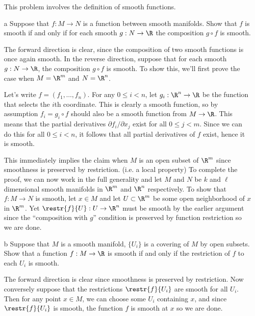 \documentclass[11pt,letterpaper]{article}
\begin{document}
\begin{solution}
    This problem involves the definition of smooth functions.
    \begin{partproblem}{a}
        Suppose that $f : M \to N$ is a function between smooth manifolds. Show that $f$ is smooth if and only if for each smooth $g: N \to \R$ the composition $g\circ f$ is smooth.
    \end{partproblem}

    \begin{solution}
        \quad The forward direction is clear, since the composition of two smooth functions is once again smooth. In the reverse direction, suppose that for each smooth $g : N \to \R$, the composition $g\circ f$ is smooth. To show this, we'll first prove the case when $M=\R^m$ and $N=\R^n$. 

        \quad Let's write $f=(f_1,\ldots,f_n)$. For any $0\leq i < n$, let $g_i : \R^n \to \R$ be the function that selects the $i$th coordinate. This is clearly a smooth function, so by assumption $f_i = g_i\circ f$ should also be a smooth function from $M\to \R$. This means that the partial derivatives $\partial f_i / \partial x_j$ exist for all $0\leq j < m$. Since we can do this for all $0\leq i < n$, it follows that all partial derivatives of $f$ exist, hence it is smooth.
        
        \quad This immediately implies the claim when $M$ is an open subset of $\R^m$ since smoothness is preserved by restriction. (i.e. a local property) To complete the proof, we can now work in the full generality and let $M$ and $N$ be $k$ and $\ell$ dimensional smooth manifolds in $\R^m$ and $\R^n$ respectively. To show that $f : M \to N$ is smooth, let $x\in M$ and let $U\subset \R^m$ be some open neighborhood of $x$ in $\R^m$. Yet $\restr{f}{U} : U \to \R^n$ must be smooth by the earlier argument since the ``composition with $g$'' condition is preserved by function restriction so we are done.
    \end{solution}

    \begin{partproblem}{b}
        Suppose that $M$ is a smooth manifold, $\{U_i\}$ is a covering of $M$ by open subsets. Show that a function $f : M \to \R$ is smooth if and only if the restriction of $f$ to each $U_i$ is smooth.
    \end{partproblem}

    \begin{solution}
        \quad The forward direction is clear since smoothness is preserved by restriction. Now conversely suppose that the restrictions $\restr{f}{U_i}$ are smooth for all $U_i$. Then for any point $x\in M$, we can choose some $U_i$ containing $x$, and since $\restr{f}{U_i}$ is smooth, the function $f$ is smooth at $x$ so we are done.
    \end{solution}


\end{solution}
\end{document}
